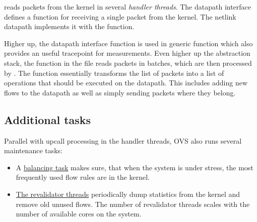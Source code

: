 reads packets from the kernel in several \emph{handler threads}. The datapath interface defines a \href{https://github.com/openvswitch/ovs/blob/e90a0727f17f6ad915a32735a8c0b282f2c8cd6f/lib/dpif-provider.h\#L387-L408}{} function for receiving a single packet from the kernel. The netlink datapath implements it with the \href{https://github.com/openvswitch/ovs/blob/e90a0727f17f6ad915a32735a8c0b282f2c8cd6f/lib/dpif-netlink.c\#L3132-L3134}{} function.

Higher up, the  datapath interface function is used in generic \href{https://github.com/openvswitch/ovs/blob/e90a0727f17f6ad915a32735a8c0b282f2c8cd6f/lib/dpif.c\#L1591-L1611}{} function which also provides an useful tracepoint \href{https://github.com/openvswitch/ovs/blob/e90a0727f17f6ad915a32735a8c0b282f2c8cd6f/lib/dpif.c\#L1618}{} for measurements. Even higher up the abstraction stack, the function \href{https://github.com/openvswitch/ovs/blob/e90a0727f17f6ad915a32735a8c0b282f2c8cd6f/ofproto/ofproto-dpif-upcall.c\#L829-L830}{} in the file  reads packets in batches, which are then processed by \href{https://github.com/openvswitch/ovs/blob/e90a0727f17f6ad915a32735a8c0b282f2c8cd6f/ofproto/ofproto-dpif-upcall.c\#L1639-L1641}{}. The  function essentially transforms the list of packets into a list of operations that should be executed on the datapath. This includes adding new flows to the datapath as well as simply sending packets where they belong.

\subsection{Additional  tasks}
\label{subsec:ovs-tasks}

Parallel with upcall processing in the handler threads, OVS also runs several maintenance tasks:
\begin{itemize}
    \item A \href{https://github.com/openvswitch/ovs/blob/e90a0727f17f6ad915a32735a8c0b282f2c8cd6f/ofproto/ofproto-dpif-upcall.c\#L3312-L3336}{balancing task} makes sure, that when the system is under stress, the most frequently used flow rules are in the kernel.
    \item \href{https://github.com/openvswitch/ovs/blob/e90a0727f17f6ad915a32735a8c0b282f2c8cd6f/ofproto/ofproto-dpif-upcall.c\#L83-L111}{The revalidator threads} periodically dump statistics from the kernel and remove old unused flows. The number of revalidator threads scales with the number of available cores on the system.
\end{itemize}

